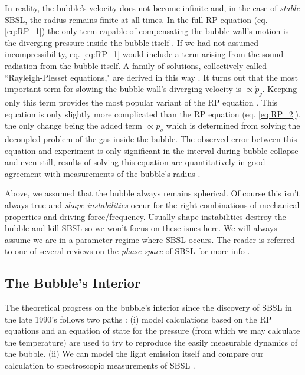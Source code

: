 \documentclass[11pt,prb,aps,nofootinbib,superscriptaddress,floatfix]{revtex4-2}
\begin{document}
In reality, the bubble's velocity does not become infinite and, in the case of \emph{stable} SBSL, the radius remains finite at all times. In the full RP equation (eq. \ref{eq:RP_1}) the only term capable of compensating the bubble wall's motion is the diverging pressure inside the bubble itself \cite{brenner2002single}. If we had not assumed incompressibility, eq. \ref{eq:RP_1} would include a term arising from the sound radiation from the bubble itself. A family of solutions, collectively called ``Rayleigh-Plesset equations," are derived in this way \cite{prosperetti1986bubble,prosperetti1988nonlinear,keller1956damping,lezzi1987bubble}. It turns out that the most important term for slowing the bubble wall's diverging velocity is $\propto\dot{p}_g$. Keeping only this term provides the most popular variant of the RP equation \cite{lofstedt1995sonoluminescing,barber1997defining}. This equation is only slightly more complicated than the RP equation (eq. \ref{eq:RP_2}), the only change being the added term $\propto \dot{p}_g$ which is determined from solving the decoupled problem of the gas inside the bubble. The observed error between this equation and experiment is only significant in the interval during bubble collapse and even still, results of solving this equation are quantitatively in good agreement with measurements of the bubble's radius \cite{brenner2002single}. 

Above, we assumed that the bubble always remains spherical. Of course this isn't always true and \emph{shape-instabilities} occur for the right combinations of mechanical properties and driving force/frequency. Usually shape-instabilities destroy the bubble and kill SBSL so we won't focus on these isues here. We will always assume we are in a parameter-regime where SBSL occurs. The reader is referred to one of several reviews on the \emph{phase-space} of SBSL for more info \cite{yasui2018acoustic,brenner2002single,hilgenfeldt1999sonoluminescence,an2009diagnosing}. 


\subsection{The Bubble's Interior}
The theoretical progress on the bubble's interior since the discovery of SBSL in the late 1990's \cite{gaitan1992sonoluminescence} follows two paths \cite{brenner2002single,suslick2008inside,yasui2018acoustic}: (i) model calculations based on the RP equations and an equation of state for the pressure (from which we may calculate the temperature) are used to try to reproduce the easily measurable dynamics of the bubble. (ii) We can model the light emission itself and compare our calculation to spectroscopic measurements of SBSL \cite{hiller1992spectrum,brenner2002single}. 
\end{document}
